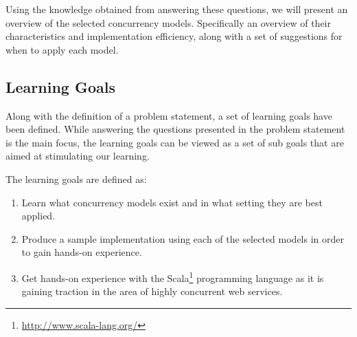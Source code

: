 Using the knowledge obtained from answering these questions, we will present an overview of the selected concurrency models. Specifically an overview of their characteristics and implementation efficiency, along with a set of suggestions for when to apply each model.

\subsection{Learning Goals}
Along with the definition of a problem statement, a set of learning goals have been defined. While answering the questions presented in the problem statement is the main focus, the learning goals can be viewed as a set of sub goals that are aimed at stimulating our learning.

The learning goals are defined as:
\begin{enumerate}
\item Learn what concurrency models exist and in what setting they are best applied.
\item Produce a sample implementation using each of the selected models in order to gain hands-on experience.
\item Get hands-on experience with the Scala\footnote{\url{http://www.scala-lang.org/}} programming language as it is gaining traction in the area of highly concurrent web services.
\end{enumerate}

\worksheetend